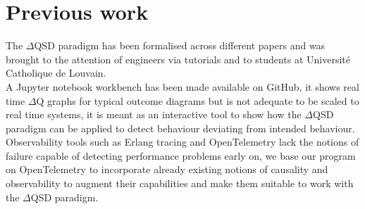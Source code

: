 \section{Previous work}
    The $\Delta$QSD paradigm has been formalised across different papers and was brought to the attention of engineers via tutorials and to students at Université Catholique de Louvain. \\
    A Jupyter notebook workbench has been made available on GitHub, it shows real time $\Delta$Q graphs for typical outcome diagrams but is not adequate to be scaled to real time systems, it is meant as an interactive tool to show how the $\Delta$QSD paradigm can be applied to detect behaviour deviating from intended behaviour.
    Observability tools such as Erlang tracing and OpenTelemetry lack the notions of failure capable of detecting performance problems early on, we base our program on OpenTelemetry to incorporate already existing notions of causality and observability to augment their capabilities and make them suitable to work with the $\Delta$QSD paradigm.
